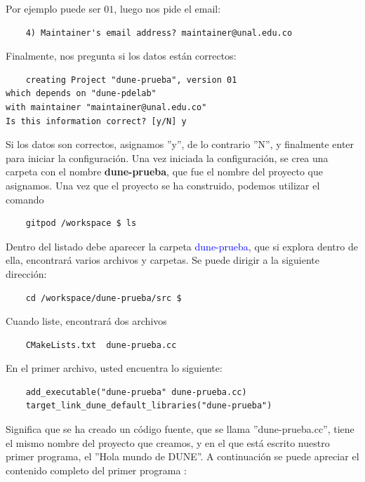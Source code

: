 \documentclass{scrarticle}
\begin{document}
Por ejemplo puede ser $01$, luego nos pide el email:
\begin{verbatim}
	4) Maintainer's email address? maintainer@unal.edu.co 
\end{verbatim}
Finalmente, nos pregunta si los datos están correctos:
\begin{verbatim}
	creating Project "dune-prueba", version 01 
which depends on "dune-pdelab"
with maintainer "maintainer@unal.edu.co"
Is this information correct? [y/N] y
\end{verbatim}
Si los datos son correctos, asignamos ''y'', de lo contrario ''N'', y finalmente enter para iniciar la configuración. Una vez iniciada la configuración,
se crea una carpeta con el nombre \textbf{dune-prueba}, que fue el nombre del proyecto que asignamos.  Una vez que 
el proyecto se ha construido, podemos utilizar el comando \begin{verbatim}
	gitpod /workspace $ ls
\end{verbatim}
Dentro del listado debe aparecer la carpeta \textcolor{blue}{dune-prueba}, que si explora dentro de ella, encontrará 
varios archivos y carpetas.  Se puede dirigir a la siguiente dirección: {\begin{verbatim}
	cd /workspace/dune-prueba/src $ 
\end{verbatim}}Cuando liste, encontrará dos archivos \begin{verbatim}
	CMakeLists.txt  dune-prueba.cc
\end{verbatim}
En el primer archivo, usted encuentra lo siguiente:
\begin{verbatim}
	add_executable("dune-prueba" dune-prueba.cc)
	target_link_dune_default_libraries("dune-prueba")

\end{verbatim} 
Significa que se ha creado un código fuente, que se llama ''dune-prueba.cc'', tiene el mismo nombre del proyecto que 
creamos, y en el que está escrito nuestro primer programa, el ''Hola mundo de DUNE''.  A continuación se puede apreciar 
el contenido completo del primer programa :

\begin{listing}[ht!]
	\inputminted{cpp}{../../src/dune-learn.cc}
\end{listing}

\immediate{}
\end{document}
